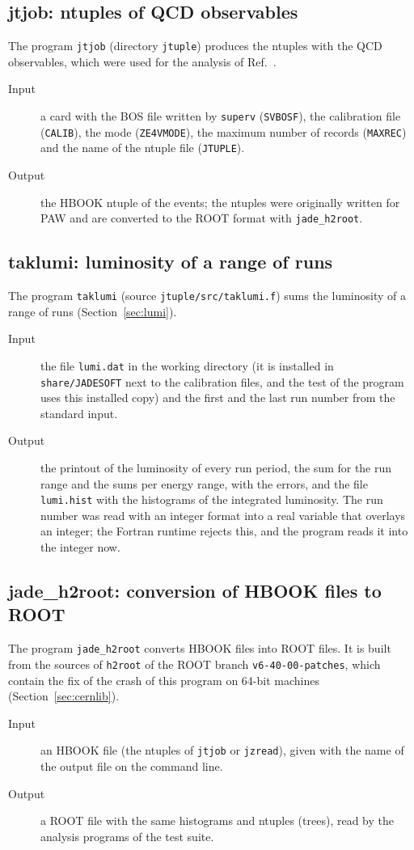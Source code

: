 \subsection{jtjob: ntuples of QCD observables}
The program \texttt{jtjob} (directory \texttt{jtuple}) produces the ntuples with the QCD observables, which were used for the analysis of Ref.~\cite{Verbytskyi:2019zhh}.
\begin{description}
\item[Input] a card with the BOS file written by \texttt{superv} (\texttt{SVBOSF}), the calibration file (\texttt{CALIB}), the mode (\texttt{ZE4VMODE}), the maximum
number of records (\texttt{MAXREC}) and the name of the ntuple file (\texttt{JTUPLE}).
\item[Output] the HBOOK ntuple of the events; the ntuples were originally written for PAW and are converted to the ROOT format with \texttt{jade\_\allowbreak{}h2root}.
\end{description}

\subsection{taklumi: luminosity of a range of runs}
The program \texttt{taklumi} (source \texttt{jtuple/\allowbreak{}src/\allowbreak{}taklumi.f}) sums the luminosity of a range of runs (Section~\ref{sec:lumi}).
\begin{description}
\item[Input] the file \texttt{lumi.dat} in the working directory (it is installed in \texttt{share/\allowbreak{}JADESOFT} next to the calibration files, and the test of the program uses this installed copy) and the first and the last run number from the standard input.
\item[Output] the printout of the luminosity of every run period, the sum for the run range and the sums per energy range, with the errors, and the file \texttt{lumi.hist}
with the histograms of the integrated luminosity. The run number was read with an integer format into a real variable that overlays an integer; the Fortran runtime rejects this, and the program reads it into the integer now.
\end{description}

\subsection{jade\_h2root: conversion of HBOOK files to ROOT}
The program \texttt{jade\_\allowbreak{}h2root} converts HBOOK files into ROOT files. It is built from the sources of \texttt{h2root} of the ROOT branch \texttt{v6-40-00-patches}, which contain the
fix of the crash of this program on 64-bit machines (Section~\ref{sec:cernlib}).
\begin{description}
\item[Input] an HBOOK file (the ntuples of \texttt{jtjob} or \texttt{jzread}), given with the name of the output file on the command line.
\item[Output] a ROOT file with the same histograms and ntuples (trees), read by the analysis programs of the test suite.
\end{description}


